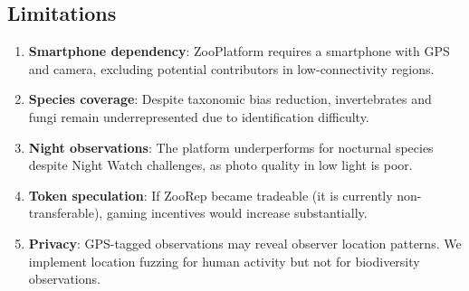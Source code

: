 \subsection{Limitations}

\begin{enumerate}
  \item \textbf{Smartphone dependency}: ZooPlatform requires a
    smartphone with GPS and camera, excluding potential contributors
    in low-connectivity regions.
  \item \textbf{Species coverage}: Despite taxonomic bias reduction,
    invertebrates and fungi remain underrepresented due to
    identification difficulty.
  \item \textbf{Night observations}: The platform underperforms for
    nocturnal species despite Night Watch challenges, as photo quality
    in low light is poor.
  \item \textbf{Token speculation}: If ZooRep became tradeable (it is
    currently non-transferable), gaming incentives would increase
    substantially.
  \item \textbf{Privacy}: GPS-tagged observations may reveal observer
    location patterns. We implement location fuzzing for human activity
    but not for biodiversity observations.
\end{enumerate}


